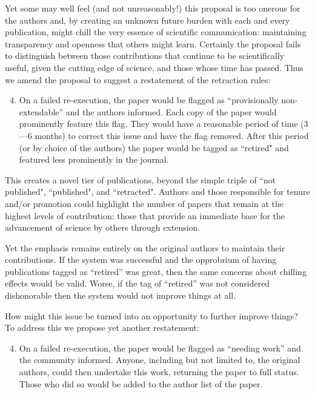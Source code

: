 \documentclass{sigchi}
\begin{document}
Yet some may well feel (and not unreasonably!) this proposal is too onerous for the authors and, by creating an unknown future burden with each and every publication, might chill the very essence of scientific communication: maintaining transparency and openness that others might learn.  Certainly the proposal fails to distinguish between those contributions that continue to be scientifically useful, given the cutting edge of science, and those whose time has passed. Thus we amend the proposal to suggest a restatement of the retraction rules:

\begin{enumerate}
	\setcounter{enumi}{3}
\item On a failed re-execution, the paper would be flagged as ``provisionally non-extendable'' and the authors informed. Each copy of the paper would prominently feature this flag. They would have a reasonable period of time (3—6 months) to correct this issue and have the flag removed. After this period (or by choice of the authors) the paper would be tagged as ``retired" and featured less prominently in the journal.
\end{enumerate}

This creates a novel tier of publications, beyond the simple triple of ``not published", ``published", and ``retracted". Authors and those responsible for tenure and/or promotion could highlight the number of papers that remain at the highest levels of contribution: those that provide an immediate base for the advancement of science by others through extension.

Yet the emphasis remains entirely on the original authors to maintain their contributions. If the system was successful and the opprobrium of having publications tagged as ``retired'' was great, then the same concerns about chilling effects would be valid. Worse, if the tag of ``retired'' was not considered dishonorable then the system would not improve things at all. 

How might this issue be turned into an opportunity to further improve things? To address this we propose yet another restatement:

\begin{enumerate}
	\setcounter{enumi}{3}
\item On a failed re-execution, the paper would be flagged as ``needing work'' and the community informed. Anyone, including but not limited to, the original authors, could then undertake this work, returning the paper to full status. Those who did so would be added to the author list of the paper.
\end{enumerate}
\end{document}

